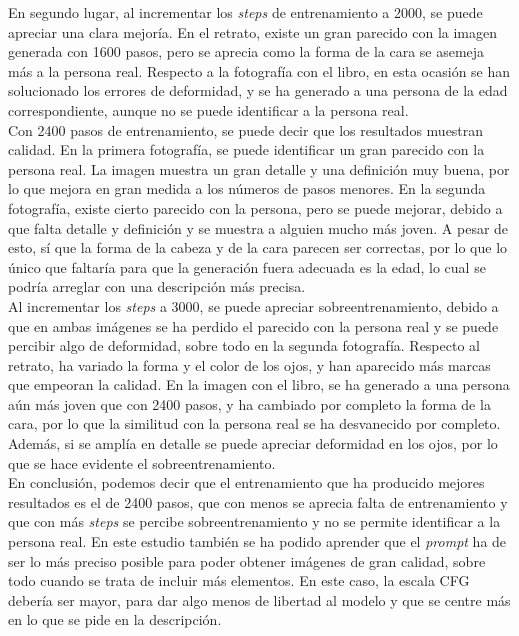 En segundo lugar, al incrementar los \textit{steps} de entrenamiento a 2000, se puede apreciar una clara mejoría. En el retrato, existe un gran parecido con la imagen generada con 1600 pasos, pero se aprecia como la forma de la cara se asemeja más a la persona real. Respecto a la fotografía con el libro, en esta ocasión se han solucionado los errores de deformidad, y se ha generado a una persona de la edad correspondiente, aunque no se puede identificar a la persona real.\\

Con 2400 pasos de entrenamiento, se puede decir que los resultados muestran calidad. En la primera fotografía, se puede identificar un gran parecido con la persona real. La imagen muestra un gran detalle y una definición muy buena, por lo que mejora en gran medida a los números de pasos menores. En la segunda fotografía, existe cierto parecido con la persona, pero se puede mejorar, debido a que falta detalle y definición y se muestra a alguien mucho más joven. A pesar de esto, sí que la forma de la cabeza y de la cara parecen ser correctas, por lo que lo único que faltaría para que la generación fuera adecuada es la edad, lo cual se podría arreglar con una descripción más precisa.\\

Al incrementar los \textit{steps} a 3000, se puede apreciar sobreentrenamiento, debido a que en ambas imágenes se ha perdido el parecido con la persona real y se puede percibir algo de deformidad, sobre todo en la segunda fotografía. Respecto al retrato, ha variado la forma y el color de los ojos, y han aparecido más marcas que empeoran la calidad. En la imagen con el libro, se ha generado a una persona aún más joven que con 2400 pasos, y ha cambiado por completo la forma de la cara, por lo que la similitud con la persona real se ha desvanecido por completo. Además, si se amplía en detalle se puede apreciar deformidad en los ojos, por lo que se hace evidente el sobreentrenamiento. \\

En conclusión, podemos decir que el entrenamiento que ha producido mejores resultados es el de 2400 pasos, que con menos se aprecia falta de entrenamiento y que con más \textit{steps} se percibe sobreentrenamiento y no se permite identificar a la persona real. En este estudio también se ha podido aprender que el \textit{prompt} ha de ser lo más preciso posible para poder obtener imágenes de gran calidad, sobre todo cuando se trata de incluir más elementos. En este caso, la escala CFG debería ser mayor, para dar algo menos de libertad al modelo y que se centre más en lo que se pide en la descripción.

